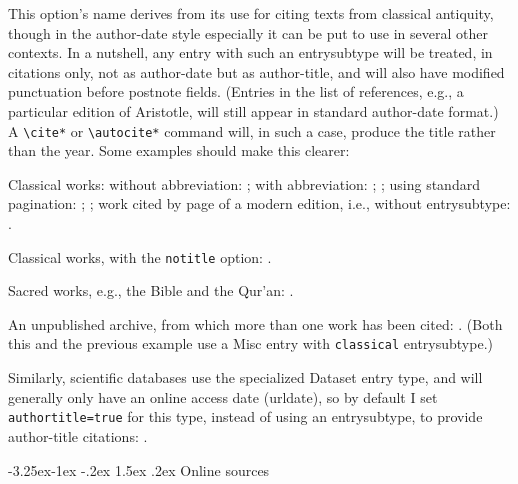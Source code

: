 \documentclass[a4paper,12pt]{article}
\makeatletter
\newcommand{\cmd}[1]{\texttt{\textbackslash #1}}
\renewcommand{\subsection}{\@startsection{subsection}{2}{\z@}%
                                     {-3.25ex\@plus -1ex \@minus -.2ex}%
                                     {1.5ex \@plus .2ex}%
                                     {\normalfont\normalsize\bfseries}}
\makeatother
\begin{document}
This option's  name
derives from its use for citing texts from classical antiquity, though
in the author-date style especially it can be put to use in several
other contexts.  In a nutshell, any entry with such an
\textsf{entrysubtype} will be treated, in citations only, not as
author-date but as author-title, and will also have modified
punctuation before \textsf{postnote} fields.  (Entries in the list of
references, e.g., a particular edition of Aristotle, will still appear
in standard author-date format.)  A \cmd{cite*} or \cmd{autocite*}
command will, in such a case, produce the title rather than the year.
Some examples should make this clearer:

Classical works: without abbreviation:
\autocite{aristotle:metaphy:trans}; with abbreviation:
\autocite{aristotle:metaphy:gr}; \autocite{plato:republic:gr}; using
standard pagination: \autocite*[3.2.996b5--8]{aristotle:metaphy:gr};
\autocite*[420e]{plato:republic:gr}; work cited by page of a modern
edition, i.e., without \textsf{entrysubtype}:
\autocite[198]{euripides:orestes}.

Classical works, with the \texttt{notitle} option:
\autocite[7.1.2]{herodotus:wilson}.

Sacred works, e.g., the Bible and the Qur'an:
\autocite[25:19--36:43]{genesis}.

An unpublished archive, from which more than one work has been cited:
\autocite[file 12]{house:papers}.  (Both this and the previous example
use a \textsf{Misc} entry with \texttt{classical}
\textsf{entrysubtype}.)

Similarly, scientific 
databases use the specialized \textsf{Dataset} entry type, and will
generally only have an online access date (\textsf{urldate}), so by
default I set \texttt{authortitle=true} for this type, instead of
using an \textsf{entrysubtype}, to provide author-title citations:
\autocite{nasa:db}.

\subsection{Online sources}
\label{sec:online}
\end{document}
